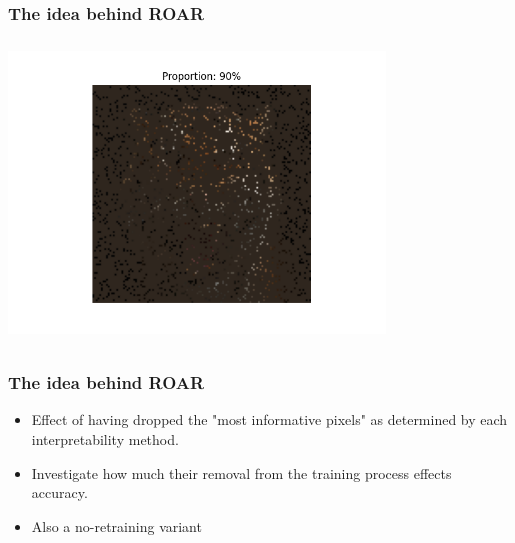 \documentclass{beamer}
\theoremstyle{mystyle}
\begin{document}
\begin{frame}
	\frametitle{The idea behind ROAR}
	\includegraphics[height=8cm, width=10cm]{tiger0.9.png}

\end{frame}



\begin{frame}
	\frametitle{The idea behind ROAR}
	\begin{itemize}
		\item Effect of having dropped the "most informative pixels" as determined by each interpretability method.
		\item Investigate how much their removal from the training process effects accuracy.		\item Also a no-retraining variant


	\end{itemize}
\end{frame}
\end{document}
